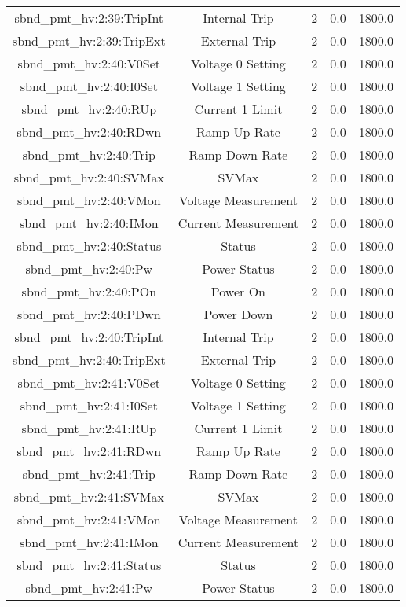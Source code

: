 \begin{center}
\begin{longtable}{c | c c c c }
sbnd\_pmt\_hv:2:39:TripInt & Internal Trip & 2 & 0.0 & 1800.0\\ 
sbnd\_pmt\_hv:2:39:TripExt & External Trip & 2 & 0.0 & 1800.0\\ 
sbnd\_pmt\_hv:2:40:V0Set & Voltage 0 Setting & 2 & 0.0 & 1800.0\\ 
sbnd\_pmt\_hv:2:40:I0Set & Voltage 1 Setting & 2 & 0.0 & 1800.0\\ 
sbnd\_pmt\_hv:2:40:RUp & Current 1 Limit & 2 & 0.0 & 1800.0\\ 
sbnd\_pmt\_hv:2:40:RDwn & Ramp Up Rate & 2 & 0.0 & 1800.0\\ 
sbnd\_pmt\_hv:2:40:Trip & Ramp Down Rate & 2 & 0.0 & 1800.0\\ 
sbnd\_pmt\_hv:2:40:SVMax & SVMax & 2 & 0.0 & 1800.0\\ 
sbnd\_pmt\_hv:2:40:VMon & Voltage Measurement & 2 & 0.0 & 1800.0\\ 
sbnd\_pmt\_hv:2:40:IMon & Current Measurement & 2 & 0.0 & 1800.0\\ 
sbnd\_pmt\_hv:2:40:Status & Status & 2 & 0.0 & 1800.0\\ 
sbnd\_pmt\_hv:2:40:Pw & Power Status & 2 & 0.0 & 1800.0\\ 
sbnd\_pmt\_hv:2:40:POn & Power On & 2 & 0.0 & 1800.0\\ 
sbnd\_pmt\_hv:2:40:PDwn & Power Down & 2 & 0.0 & 1800.0\\ 
sbnd\_pmt\_hv:2:40:TripInt & Internal Trip & 2 & 0.0 & 1800.0\\ 
sbnd\_pmt\_hv:2:40:TripExt & External Trip & 2 & 0.0 & 1800.0\\ 
sbnd\_pmt\_hv:2:41:V0Set & Voltage 0 Setting & 2 & 0.0 & 1800.0\\ 
sbnd\_pmt\_hv:2:41:I0Set & Voltage 1 Setting & 2 & 0.0 & 1800.0\\ 
sbnd\_pmt\_hv:2:41:RUp & Current 1 Limit & 2 & 0.0 & 1800.0\\ 
sbnd\_pmt\_hv:2:41:RDwn & Ramp Up Rate & 2 & 0.0 & 1800.0\\ 
sbnd\_pmt\_hv:2:41:Trip & Ramp Down Rate & 2 & 0.0 & 1800.0\\ 
sbnd\_pmt\_hv:2:41:SVMax & SVMax & 2 & 0.0 & 1800.0\\ 
sbnd\_pmt\_hv:2:41:VMon & Voltage Measurement & 2 & 0.0 & 1800.0\\ 
sbnd\_pmt\_hv:2:41:IMon & Current Measurement & 2 & 0.0 & 1800.0\\ 
sbnd\_pmt\_hv:2:41:Status & Status & 2 & 0.0 & 1800.0\\ 
sbnd\_pmt\_hv:2:41:Pw & Power Status & 2 & 0.0 & 1800.0\\ 

\end{longtable}
\end{center}
